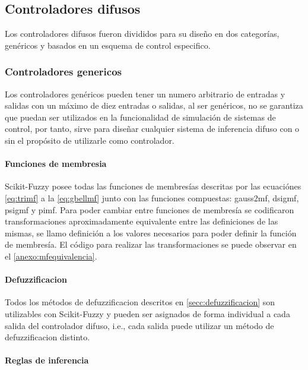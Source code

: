     \subsection{Controladores difusos}

        Los controladores difusos fueron divididos para su diseño en dos categorías, genéricos y basados en un esquema de control especifico.
        
        \subsubsection{Controladores genericos}

            Los controladores genéricos pueden tener un numero arbitrario de entradas y salidas con un máximo de diez entradas o salidas, al ser genéricos, no se garantiza que puedan ser utilizados en la funcionalidad de simulación de sistemas de control, por tanto, sirve para diseñar cualquier sistema de inferencia difuso con o sin el propósito de utilizarle como controlador.

            \paragraph{Funciones de membresia}

                Scikit-Fuzzy posee todas las funciones de membresías descritas por las ecuaciónes \cref{eq:trimf} a la \cref{eq:gbellmf} junto con las funciones compuestas: gauss2mf, dsigmf, psigmf y pimf. Para poder cambiar entre funciones de membresía se codificaron transformaciones aproximadamente equivalente entre las definiciones de las mismas, se llamo definición a los valores necesarios para poder definir la función de membresía. El código para realizar las transformaciones se puede observar en el \ref{anexo:mfequivalencia}.

            \paragraph{Defuzzificacion}

                Todos los métodos de defuzzificacion descritos en \cref{secc:defuzzificacion} son utilizables con Scikit-Fuzzy y pueden ser asignados de forma individual a cada salida del controlador difuso, i.e., cada salida puede utilizar un método de defuzzificacion distinto.

            \paragraph{Reglas de inferencia}

